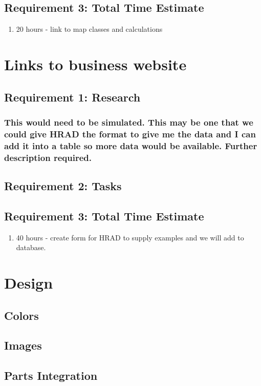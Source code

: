 \documentclass [10pt] {article}
\begin{document}
\subsection{Requirement 3: Total Time Estimate}
\begin{enumerate}
\item 20 hours - link to map classes and calculations
\end{enumerate}


\section{Links to business website}
\subsection{Requirement 1: Research}
\subsubsection{This would need to be simulated.  This may be one that we could give HRAD the format to give me the data and I can add it into a table so more data would be available.  Further description required.}
\subsection{Requirement 2: Tasks}
\subsection{Requirement 3: Total Time Estimate}
\begin{enumerate}
\item 40 hours - create form for HRAD to supply examples and we will add to database.
\end{enumerate}

\section{Design}
\subsection{Colors}
\subsection{Images}
\subsection{Parts Integration}
\end{document}
